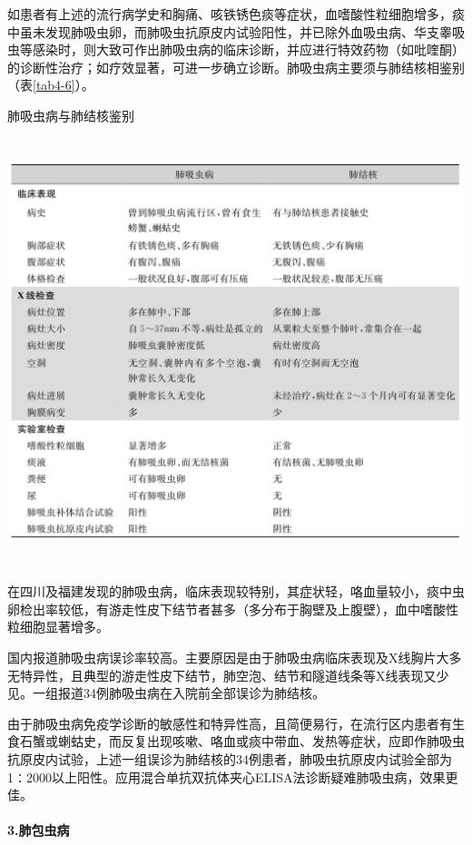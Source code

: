 如患者有上述的流行病学史和胸痛、咳铁锈色痰等症状，血嗜酸性粒细胞增多，痰中虽未发现肺吸虫卵，而肺吸虫抗原皮内试验阳性，并已除外血吸虫病、华支睾吸虫等感染时，则大致可作出肺吸虫病的临床诊断，并应进行特效药物（如吡喹酮）的诊断性治疗；如疗效显著，可进一步确立诊断。肺吸虫病主要须与肺结核相鉴别（表\ref{tab4-6}）。

\begin{table}[htbp]
\centering
\caption{肺吸虫病与肺结核鉴别}
\label{tab4-6}
\includegraphics[width=5.94792in,height=4.91667in]{./images/Image00043.jpg}
\end{table}

在四川及福建发现的肺吸虫病，临床表现较特别，其症状轻，咯血量较小，痰中虫卵检出率较低，有游走性皮下结节者甚多（多分布于胸壁及上腹壁），血中嗜酸性粒细胞显著增多。

国内报道肺吸虫病误诊率较高。主要原因是由于肺吸虫病临床表现及X线胸片大多无特异性，且典型的游走性皮下结节，肺空泡、结节和隧道线条等X线表现又少见。一组报道34例肺吸虫病在入院前全部误诊为肺结核。

由于肺吸虫病免疫学诊断的敏感性和特异性高，且简便易行，在流行区内患者有生食石蟹或蝲蛄史，而反复出现咳嗽、咯血或痰中带血、发热等症状，应即作肺吸虫抗原皮内试验，上述一组误诊为肺结核的34例患者，肺吸虫抗原皮内试验全部为1∶2000以上阳性。应用混合单抗双抗体夹心ELISA法诊断疑难肺吸虫病，效果更佳。

\paragraph{3.肺包虫病}

